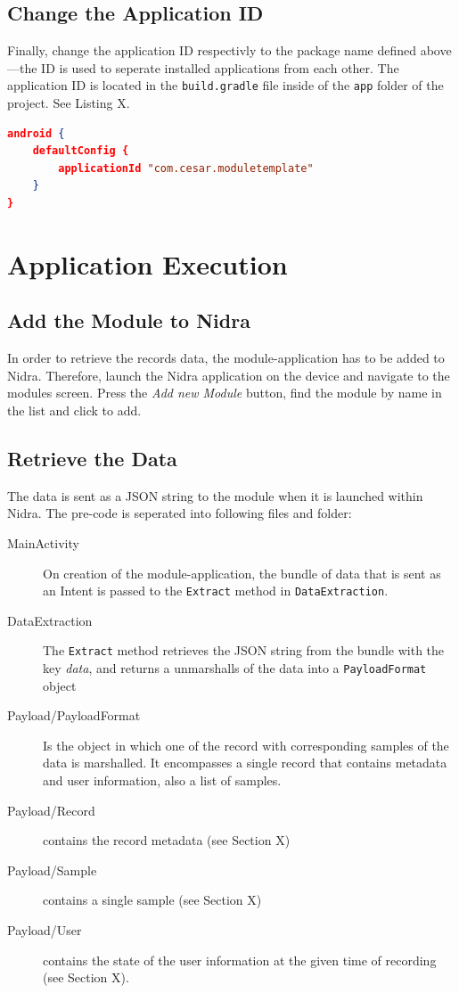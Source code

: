 \subsection{Change the Application ID}
Finally, change the application ID respectivly to the package name defined above---the ID is used to seperate installed applications from each other. The application ID is located in the \verb|build.gradle| file inside of the \verb|app| folder of the project. See Listing X.

\begin{lstlisting}[language=json, caption={My Caption}, captionpos=b]
android {
    defaultConfig {
        applicationId "com.cesar.moduletemplate"
    }
}
\end{lstlisting}

\section{Application Execution}


\subsection{Add the Module to Nidra}
In order to retrieve the records data, the module-application has to be added to Nidra. Therefore, launch the Nidra application on the device and navigate to the modules screen. Press the \textit{Add new Module} button, find the module by name in the list and click to add. 

\subsection{Retrieve the Data}
The data is sent as a JSON string to the module when it is launched within Nidra. The pre-code is seperated into following files and folder:

\begin{description}
    \item[MainActivity] On creation of the module-application, the bundle of data that is sent as an Intent is passed to the \verb|Extract| method in \verb|DataExtraction|.
    \item[DataExtraction] The \verb|Extract| method retrieves the JSON string from the bundle with the key \textit{data}, and returns a unmarshalls of the data into a \verb|PayloadFormat| object
    \item[Payload/PayloadFormat] Is the object in which one of the record with corresponding samples of the data is marshalled. It encompasses a single record that contains metadata and user information, also a list of samples. 
    \item[Payload/Record] contains the record metadata (see Section X)
    \item[Payload/Sample] contains a single sample (see Section X)
    \item[Payload/User] contains the state of the user information at the given time of recording (see Section X).
\end{description}

